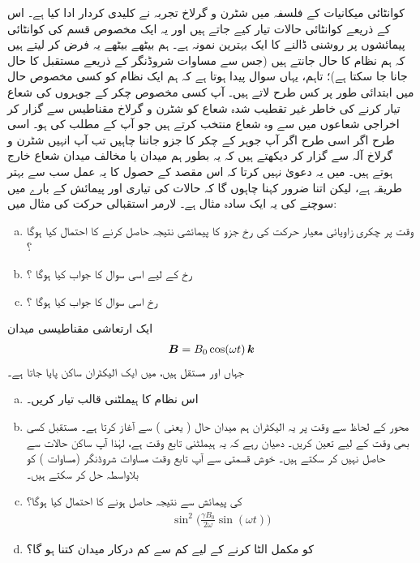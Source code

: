  کوانٹائی میکانیات کے فلسفہ میں شٹرن و گرلاخ تجربہ نے کلیدی کردار ادا کیا ہے۔ اس کے ذریعے کوانٹائی حالات تیار کیے جاتے ہیں اور یہ ایک مخصوص قسم کی کوانٹائی پیمائشوں پر روشنی ڈالنے کا ایک بہترین نمونہ ہے۔ ہم بیٹھے بیٹھے یہ فرض کر لیتے ہیں کہ ہم نظام کا  حال جانتے ہیں (جس سے مساوات شروڈنگر کے ذریعے مستقبل کا حال جانا جا سکتا ہے)؛ تاہم، یہاں سوال پیدا ہوتا ہے کہ ہم ایک نظام کو کسی مخصوص حال میں ابتدائی طور پر کس طرح لاتے ہیں۔ آپ کسی مخصوص چکر کے جوہروں کی شعاع تیار کرنے کی خاطر غیر تقطیب شدہ شعاع کو شٹرن و گرلاخ مقناطیس سے گزار کر اخراجی شعاعوں میں سے وہ شعاع منتخب کرتے ہیں جو آپ کے مطلب کی ہو۔ اسی طرح اگر اسی طرح اگر آپ جوہر کے چکر کا  جزو جاننا چاہیں تب آپ انہیں شٹرن و گرلاخ آلہ سے گزار کر دیکھتے ہیں کہ یہ بطور ہم میدان یا مخالف میدان شعاع خارج ہوتے ہیں۔ میں یہ دعویٰ نہیں کرتا کہ اس مقصد کے حصول کا یہ عمل سب سے بہتر طریقہ ہے، لیکن اتنا ضرور کہنا چاہوں گا کہ حالات کی تیاری اور پیمائش کے بارے میں سوچنے کی یہ ایک سادہ مثال ہے۔ 
لارمر استقبالی حرکت کی مثال  میں:
\begin{enumerate}[a.]
\item
وقت  پر چکری زاویائی معیار حرکت کی  رخ جزو کا پیمائشی نتیجہ  حاصل کرنے کا احتمال کیا ہوگا ؟
\item
{} رخ کے لیے اسی سوال کا جواب کیا ہوگا ؟
\item 
{} رخ اسی سوال کا جواب کیا ہوگا ؟
\end{enumerate}
ایک ارتعاشی مقناطیسی میدان 
\begin{align*}
{\ensuremath{{\boldsymbol{B}}}} = B_0 \cos(\omega t) \,{\boldsymbol{k}}
\end{align*}
جہاں  اور  مستقل ہیں، میں ایک الیکٹران ساکن پایا جاتا ہے۔
\begin{enumerate}[a.]
\item
اس نظام کا ہیملٹنی قالب تیار کریں۔
\item
محور  کے لحاظ سے وقت  پر یہ الیکٹران ہم میدان حال ( یعنی ) سے آغاز کرتا ہے۔ مستقبل کسی بھی وقت کے لیے  تعین کریں۔ دھیان رہے کہ یہ ہیملٹنی تابع وقت ہے، لہٰذا آپ ساکن حالات سے  حاصل نہیں کر سکتے ہیں۔ خوش قسمتی سے آپ تابع وقت مساوات شروڈنگر (مساوات ) کو بلاواسطہ حل کر سکتے ہیں۔ 
\item
{} کی پیمائش سے  نتیجہ حاصل ہونے کا احتمال کیا ہوگا؟  
\begin{align*}
\sin^2 \big ( \frac{\gamma B_0}{2 \omega} \sin(\omega t) \big )
\end{align*}
\item
{} کو مکمل الٹا کرنے کے لیے کم سے کم درکار میدان  کتنا ہو گا؟ 
\end{enumerate}
